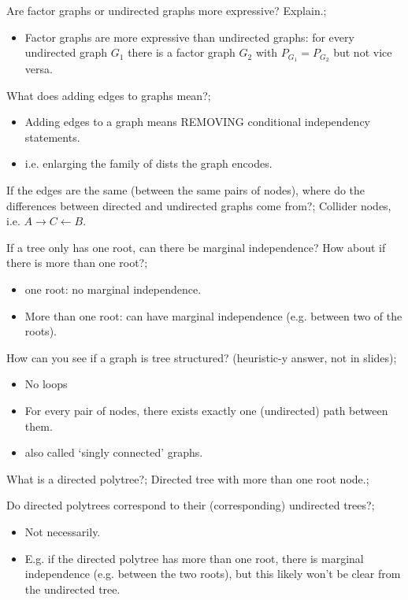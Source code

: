 \documentclass{article}
\begin{document}

Are factor graphs or undirected graphs more expressive? Explain.; \begin{itemize} \item Factor graphs are more expressive than undirected graphs: for every undirected graph $G_1$ there is a factor graph $G_2$ with $P_{G_1}=P_{G_2}$ but not vice versa.  \end{itemize} 

What does adding edges to graphs mean?; \begin{itemize} \item Adding edges to a graph means REMOVING conditional independency statements.  \item i.e. enlarging the family of dists the graph encodes.  \end{itemize}

If the edges are the same (between the same pairs of nodes), where do the differences between directed and undirected graphs come from?; Collider nodes, i.e. $A\rightarrow C \leftarrow B$.

If a tree only has one root, can there be marginal independence? How about if there is more than one root?; \begin{itemize} \item one root: no marginal independence.  \item More than one root: can have marginal independence (e.g. between two of the roots).  \end{itemize}

How can you see if a graph is tree structured? (heuristic-y answer, not in slides); \begin{itemize} \item No loops \item For every pair of nodes, there exists exactly one (undirected) path between them.  \item also called `singly connected' graphs.  \end{itemize}

What is a directed polytree?; Directed tree with more than one root node.;

Do directed polytrees correspond to their (corresponding) undirected trees?; \begin{itemize} \item Not necessarily.  \item E.g. if the directed polytree has more than one root, there is marginal independence (e.g. between the two roots), but this likely won't be clear from the undirected tree.  \end{itemize}
\end{document}
